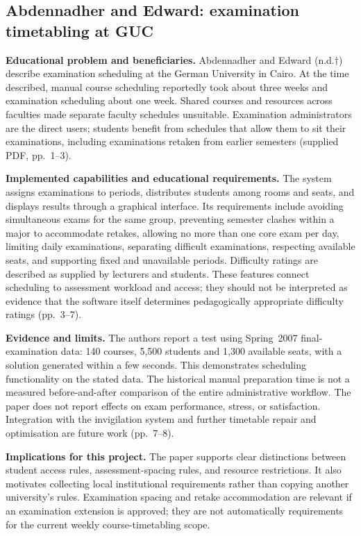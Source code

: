 \documentclass[
  11pt,a4paper,oneside]{report}
\begin{document}
\subsection{Abdennadher and Edward: examination timetabling at GUC}
\textbf{Educational problem and beneficiaries.} Abdennadher and Edward (n.d.$\dagger$) describe examination scheduling at the German University in Cairo. At the time described, manual course scheduling reportedly took about three weeks and examination scheduling about one week. Shared courses and resources across faculties made separate faculty schedules unsuitable. Examination administrators are the direct users; students benefit from schedules that allow them to sit their examinations, including examinations retaken from earlier semesters (supplied PDF, pp.~1--3).

\textbf{Implemented capabilities and educational requirements.} The system assigns examinations to periods, distributes students among rooms and seats, and displays results through a graphical interface. Its requirements include avoiding simultaneous exams for the same group, preventing semester clashes within a major to accommodate retakes, allowing no more than one core exam per day, limiting daily examinations, separating difficult examinations, respecting available seats, and supporting fixed and unavailable periods. Difficulty ratings are described as supplied by lecturers and students. These features connect scheduling to assessment workload and access; they should not be interpreted as evidence that the software itself determines pedagogically appropriate difficulty ratings (pp.~3--7).

\textbf{Evidence and limits.} The authors report a test using Spring~2007 final-examination data: 140 courses, 5,500 students and 1,300 available seats, with a solution generated within a few seconds. This demonstrates scheduling functionality on the stated data. The historical manual preparation time is not a measured before-and-after comparison of the entire administrative workflow. The paper does not report effects on exam performance, stress, or satisfaction. Integration with the invigilation system and further timetable repair and optimisation are future work (pp.~7--8).

\textbf{Implications for this project.} The paper supports clear distinctions between student access rules, assessment-spacing rules, and resource restrictions. It also motivates collecting local institutional requirements rather than copying another university's rules. Examination spacing and retake accommodation are relevant if an examination extension is approved; they are not automatically requirements for the current weekly course-timetabling scope.
\end{document}
